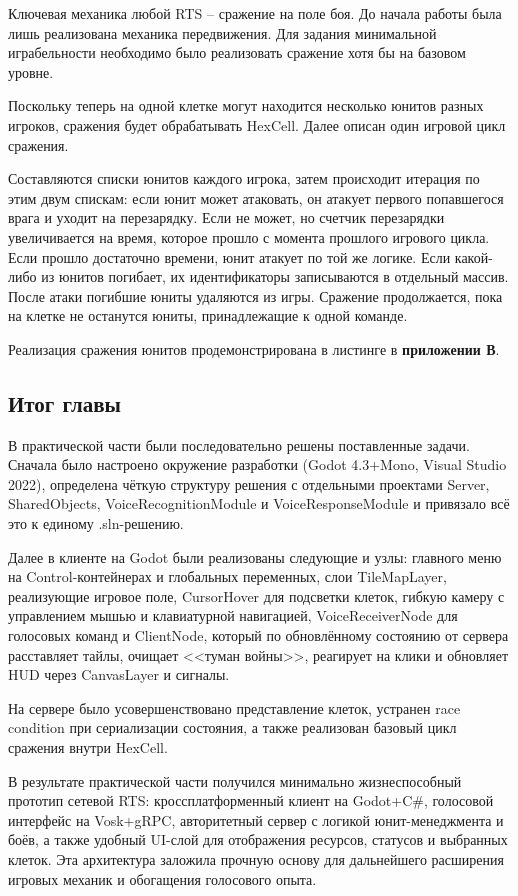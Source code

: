         Ключевая механика любой RTS -- сражение на поле боя. До начала работы была лишь реализована механика передвижения. Для задания минимальной
        играбельности необходимо было реализовать сражение хотя бы на базовом уровне.

        Поскольку теперь на одной клетке могут находится несколько юнитов разных игроков, сражения будет обрабатывать HexCell. Далее описан один игровой цикл сражения.
        
        Составляются списки юнитов каждого игрока, затем происходит итерация по этим двум спискам: если юнит может атаковать, он атакует первого попавшегося врага и уходит на перезарядку.
        Если не может, но счетчик перезарядки увеличивается на время, которое прошло с момента прошлого игрового цикла. Если прошло достаточно времени, юнит 
        атакует по той же логике. Если какой-либо из юнитов погибает, их идентификаторы записываются в отдельный массив. После атаки погибшие юниты удаляются из
        игры. Сражение продолжается, пока на клетке не останутся юниты, принадлежащие к одной команде.

        Реализация сражения юнитов продемонстрирована в листинге в \textbf{приложении В}.
    \subsection{Итог главы}

    В практической части были последовательно решены поставленные задачи. 
    Сначала было настроено окружение разработки (Godot 4.3+Mono, Visual Studio 2022), определена чёткую структуру решения с отдельными 
    проектами Server, SharedObjects, VoiceRecognitionModule и VoiceResponseModule и привязало всё это к единому .sln-решению.

    Далее в клиенте на Godot были реализованы следующие и узлы: главного меню на Control-контейнерах и глобальных переменных, слои TileMapLayer, 
    реализующие игровое поле, CursorHover для подсветки клеток, гибкую камеру с управлением мышью и клавиатурной 
    навигацией, VoiceReceiverNode для голосовых команд и ClientNode, который по обновлённому состоянию от сервера расставляет 
    тайлы, очищает <<туман войны>>, реагирует на клики и обновляет HUD через CanvasLayer и сигналы.
    
    На сервере было усовершенствовано представление клеток, устранен race condition при сериализации состояния, 
    а также реализован базовый цикл сражения внутри HexCell.
    
    В результате практической части получился минимально жизнеспособный прототип сетевой RTS: кроссплатформенный клиент на Godot+C\#, голосовой 
    интерфейс на Vosk+gRPC, авторитетный сервер с логикой юнит-менеджмента и боёв, а также удобный UI-слой для отображения ресурсов, статусов и 
    выбранных клеток. Эта архитектура заложила прочную основу для дальнейшего расширения игровых механик и обогащения 
    голосового опыта.